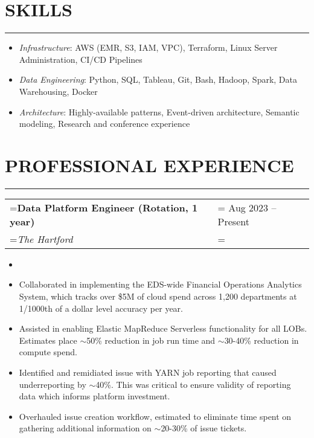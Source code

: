 \documentclass{article}
\begin{document}
\section*{\normalsize{SKILLS}}
\vspace{-1.8em}
\noindent\rule{\textwidth}{.5pt}
\begin{itemize}[label={}, leftmargin=1em]
    \setlength\itemsep{0em}
    \item \textit{Infrastructure}: AWS (EMR, S3, IAM, VPC), Terraform, Linux Server Administration, CI/CD Pipelines
    \item \textit{Data Engineering}: Python, SQL, Tableau, Git, Bash, Hadoop, Spark, Data Warehousing, Docker
    \item \textit{Architecture}: Highly-available patterns, Event-driven architecture, Semantic modeling, Research and conference experience 
\end{itemize}


\section*{\normalsize{PROFESSIONAL EXPERIENCE}}
\vspace{-1.8em}
\noindent\rule{\textwidth}{.5pt}

\vspace{.5em}
\hspace{-1em}
\begin{tabularx}{\textwidth}{
    >{\raggedright\arraybackslash\hsize=1\hsize\linewidth=\hsize}X
    >{\raggedleft\arraybackslash\hsize=1\hsize\linewidth=\hsize}X }
    \textbf{Data Platform Engineer (Rotation, 1 year)} & Aug 2023 -- Present\\
    \textit{The Hartford} & \\
\end{tabularx}
\vspace{-.5em}
\begin{itemize}[label={--}, leftmargin=1em]
    \setlength\itemsep{0em}
    \item 
    \item Collaborated in implementing the EDS-wide Financial Operations Analytics System, which tracks over \$5M of cloud spend across 1,200 departments at 1/1000th of a dollar level accuracy per year.
    \item Assisted in enabling Elastic MapReduce Serverless functionality for all LOBs. Estimates place $\sim$50\% reduction in job run time and $\sim$30-40\% reduction in compute spend.
    \item Identified and remidiated issue with YARN job reporting that caused underreporting by $\sim$40\%. This was critical to ensure validity of reporting data which informs platform investment.
    \item Overhauled issue creation workflow, estimated to eliminate time spent on gathering additional information on $\sim$20-30\% of issue tickets. 
\end{itemize}
\end{document}
